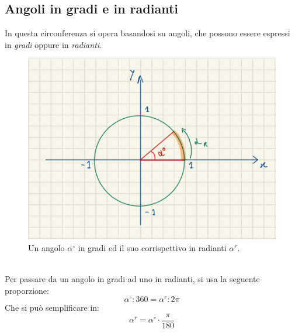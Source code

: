 \documentclass[12pt]{article}
\begin{document}
\subsection{Angoli in gradi e in radianti}
In questa circonferenza si opera basandosi su angoli, che possono essere espressi in \textit{gradi} oppure in \textit{radianti}.
\begin{figure}[!htb]
    \centering
    \includegraphics[width=1\textwidth, height=.7\textheight,keepaspectratio]{lezione_6/circonferenza_goniometrica_angolo.PNG}
    \begin{center}
        \caption{\label{fig:angolo_circonferenza}Un angolo $\alpha^{\circ}$ in gradi ed il suo corrispettivo in radianti $\alpha^r$.}
    \end{center}
\end{figure}\\
Per passare da un angolo in gradi ad uno in radianti, si usa la seguente proporzione:
\begin{equation}
    \alpha^{\circ}:360=\alpha^r:2\pi \label{eq:gradi_radianti}
\end{equation}
Che si può semplificare in:
\begin{equation}
    \alpha^r=\alpha^{\circ} \cdot \dfrac{\pi}{180}  \label{eq:gradi_radianti_solved}
\end{equation}
\end{document}
